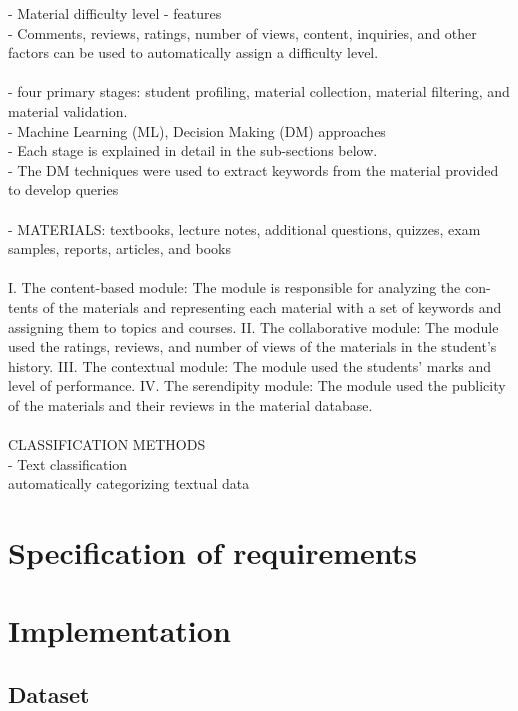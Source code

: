 \documentclass[10pt,oneside,english,a4paper]{article}
\begin{document}
%
%
- Material difficulty level - features\\
- Comments, reviews, ratings, number of views, content, inquiries, and other factors can be used to automatically assign a difficulty level.\\\\
- four primary stages: student profiling, material collection, material filtering, and material validation. \\
- Machine Learning (ML), Decision Making (DM) approaches\\
- Each stage is explained in detail in the sub-sections below.\\
- The DM techniques were used to extract keywords from the material provided to develop queries\\\\
- MATERIALS: textbooks, lecture notes, additional questions, quizzes, exam samples, reports, articles, and books\\\\
%
I. The content-based module: The module is responsible for analyzing the con-
tents of the materials and representing each material with a set of keywords and
assigning them to topics and courses.
II. The collaborative module: The module used the ratings, reviews, and number of
views of the materials in the student’s history.
III. The contextual module: The module used the students’ marks and level of
performance.
IV. The serendipity module: The module used the publicity of the materials and their
reviews in the material database.
\cite{Zayet20237487}\\\\
%
CLASSIFICATION METHODS\\
- Text classification\\
automatically categorizing textual data



\clearpage
\section{Specification of requirements}

\clearpage{}
\section{Implementation}

\subsection{Dataset}
\end{document}
